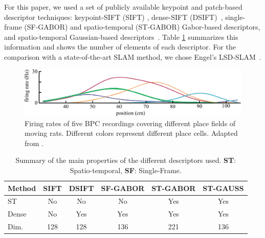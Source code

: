 For this paper, we used a set of publicly available keypoint and patch-based descriptor techniques: keypoint-SIFT (SIFT) \cite{lowe2004distinctive}, dense-SIFT (DSIFT)~\cite{vedaldi2010vlfeat}, single-frame (SF-GABOR) and spatio-temporal (ST-GABOR) Gabor-based descriptors, and spatio-temporal Gaussian-based descriptors~\cite{rivera2014bmvc}. Table \ref{table:methods} summarizes this information and shows the number of elements of each descriptor. For the comparison with a state-of-the-art SLAM method, we chose Engel's LSD-SLAM~\cite{engel2014lsd}.


\begin{figure}[]
\includegraphics[width=\linewidth]{gfx/Chapter05/dragoi_et_al_place_cell.pdf}
\caption{Firing rates of five BPC recordings covering different place fields of moving rats. Different colors represent different place cells. Adapted from \citep{dragoi2014selection}.}
\label{fig:BPCdragoi}
\end{figure}

\begin{table}
\centering
   \begin{tabular}{lccccc}
    Method          & SIFT & DSIFT & SF-GABOR & ST-GABOR & ST-GAUSS \\ \hline
    ST			   & No   & No    & No       & Yes      & Yes      \\ \hline
    Dense           & No   & Yes   & Yes      & Yes      & Yes      \\ \hline
    Dim.       & 128  & 128   & 136      & 221      & 136      \\
    \end{tabular}
\label{table:methods}
\caption{Summary of the main properties of the different descriptors used. \textbf{ST}: Spatio-temporal, \textbf{SF}: Single-Frame.}
\end{table}




